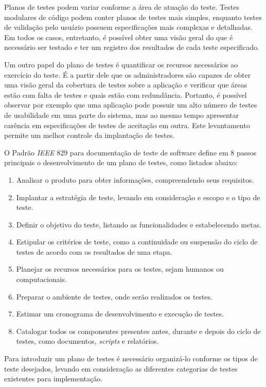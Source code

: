 Planos de testes podem variar conforme a área de atuação do teste. Testes modulares de código podem conter planos de testes mais simples, enquanto testes de validação pelo usuário possuem especificações mais complexas e detalhadas. Em todos os casos, entretanto, é possível obter uma visão geral do que é necessário ser testado e ter um registro dos resultados de cada teste especificado.

Um outro papel do plano de testes é quantificar os recursos necessários ao exercício do teste. É a partir dele que os administradores são capazes de obter uma visão geral da cobertura de testes sobre a aplicação e verificar que áreas estão com falta de testes e quais estão com redundância. Portanto, é possível observar por exemplo que uma aplicação pode possuir um alto número de testes de usabilidade em uma parte do sistema, mas ao mesmo tempo apresentar carência em especificações de testes de aceitação em outra. Este levantamento permite um melhor controle da implantação de testes.

O Padrão \emph{IEEE} 829 \cite{software2008ieee} para documentação de teste de software define em 8 passos principais o desenvolvimento de um plano de testes, como listados abaixo:
\begin{enumerate}
    \item Analisar o produto para obter informações, compreendendo seus requisitos.
    \item Implantar a estratégia de teste, levando em consideração e escopo e o tipo de teste.
    \item Definir o objetivo do teste, listando as funcionalidades e estabelecendo metas.
    \item Estipular os critérios de teste, como a continuidade ou suspensão do ciclo de testes de acordo com os resultados de uma etapa.
    \item Planejar os recursos necessários para os testes, sejam humanos ou computacionais.
    \item Preparar o ambiente de testes, onde serão realizados os testes.
    \item Estimar um cronograma de desenvolvimento e execução de testes.
    \item Catalogar todos os componentes presentes antes, durante e depois do ciclo de testes, como documentos, \emph{scripts} e relatórios.
\end{enumerate}

Para introduzir um plano de testes é necessário organizá-lo conforme os tipos de teste desejados, levando em consideração as diferentes categorias de testes existentes para implementação.

